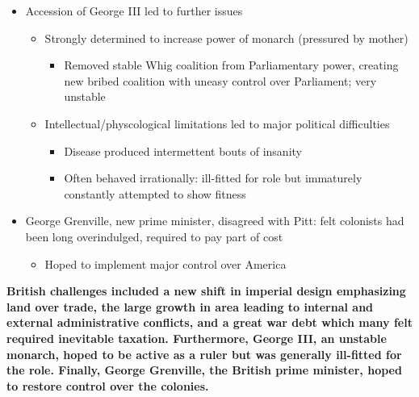 \documentclass[a4paper]{article}
\begin{document}
{\begin{itemize}
\begin{itemize}
            \item Landlords/merchants objected to tax increases
            \item Necessity to station troops on American-Indian borders led to further costs
            \item Little response of colonial assemblies in war efforts gave Britian little reason to rely on cooperation
            \item Believed that only solution would be new system of taxation
        \end{itemize}
        \item Accession of George III led to further issues
        \begin{itemize}
            \item Strongly determined to increase power of monarch (pressured by mother)
            \begin{itemize}
                \item Removed stable Whig coalition from Parliamentary power, creating new bribed coalition with uneasy control over Parliament; very unstable 
            \end{itemize}
            \item Intellectual/physcological limitations led to major political difficulties
            \begin{itemize}
                \item Disease produced intermettent bouts of insanity
                \item Often behaved irrationally: ill-fitted for role but immaturely constantly attempted to show fitness
            \end{itemize}
        \end{itemize}
        \item George Grenville, new prime minister, disagreed with Pitt: felt colonists had been long overindulged, required to pay part of cost
        \begin{itemize}
            \item Hoped to implement major control over America
        \end{itemize}
    \end{itemize}
    \textbf{British challenges included a new shift in imperial design emphasizing land over trade, the large growth in area leading to internal and external administrative conflicts, and a great war debt which many felt required inevitable taxation. Furthermore, George III, an unstable monarch, hoped to be active as a ruler but was generally ill-fitted for the role. Finally, George Grenville, the British prime minister, hoped to restore control over the colonies.}}
\end{document}
